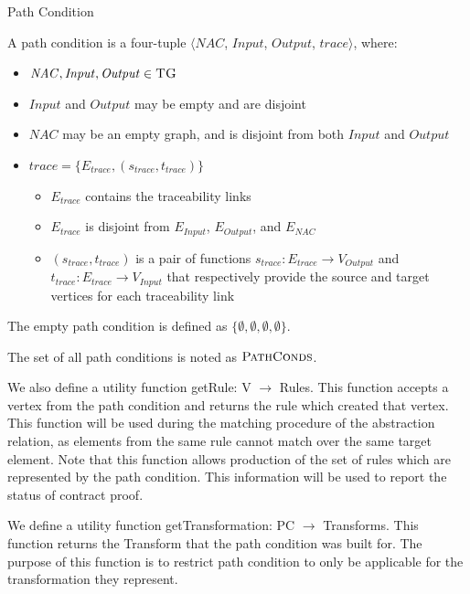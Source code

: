 


\begin{definition}{Path Condition\\}
\label{def:path_condition}

A path condition is a four-tuple $\big\langle \mathit{NAC}$, $\mathit{Input}$, $\mathit{Output}$, $\mathit{trace}\big\rangle$, where:

\begin{itemize}
\item $\mathit{NAC}, \mathit{Input}, \mathit{Output} \in \textsc{TG}$
\item $\mathit{Input}$ and $\mathit{Output} $ may be empty and are disjoint
\item $\mathit{NAC}$ may be an empty graph, and is disjoint from both $\mathit{Input}$ and $\mathit{Output} $
\item $\mathit{trace} = \{E_{trace}, (s_{trace}, t_{trace})\}$
\begin{itemize}
\item $E_{trace}$ contains the traceability links
\item $E_{trace} $ is disjoint from $E_{Input}$, $E_{Output}$, and $E_{NAC}$
\item $(s_{trace}, t_{trace})$ is a pair of functions $s_{trace}: E_{trace}\rightarrow V_{\textit{Output}}$ and $t_{trace}: E_{trace}\rightarrow V_{\textit{Input}}$ that respectively provide the source and target vertices for each traceability link
\end{itemize}

\end{itemize}  

The empty path condition is defined as $\{\emptyset, \emptyset, \emptyset, \emptyset \}$.

The set of all path conditions is noted as $\textsc{PathConds}$.

We also define a utility function getRule: V $\rightarrow$ Rules. This function accepts a vertex from the path condition and returns the rule which created that vertex. This function will be used during the matching procedure of the abstraction relation, as elements from the same rule cannot match over the same target element. Note that this function allows production of the set of rules which are represented by the path condition. This information will be used to report the status of contract proof. 

We define a utility function getTransformation: PC $\rightarrow$ Transforms. This function returns the Transform that the path condition was built for. The purpose of this function is to restrict path condition to only be applicable for the transformation they represent.



\end{definition}



